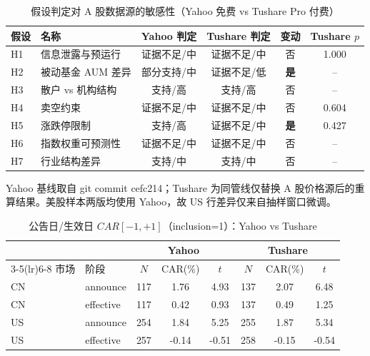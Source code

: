 \begin{table}[htbp]\centering
\caption{假设判定对 A 股数据源的敏感性（Yahoo 免费 vs Tushare Pro 付费）}
\label{tab:yahoo-vs-tushare-verdicts}
\begin{tabular}{llcccc}
\toprule
假设 & 名称 & Yahoo 判定 & Tushare 判定 & 变动 & Tushare $p$ \\
\midrule
H1 & 信息泄露与预运行 & 证据不足/中 & 证据不足/中 & 否 & 1.000 \\
H2 & 被动基金 AUM 差异 & 部分支持/中 & 证据不足/低 & \textbf{是} & -- \\
H3 & 散户 vs 机构结构 & 支持/高 & 支持/高 & 否 & -- \\
H4 & 卖空约束 & 证据不足/中 & 证据不足/中 & 否 & 0.604 \\
H5 & 涨跌停限制 & 支持/高 & 证据不足/中 & \textbf{是} & 0.427 \\
H6 & 指数权重可预测性 & 证据不足/中 & 证据不足/中 & 否 & -- \\
H7 & 行业结构差异 & 支持/中 & 支持/中 & 否 & -- \\
\bottomrule
\end{tabular}
\par\smallskip\footnotesize Yahoo 基线取自 git commit cefc214；Tushare 为同管线仅替换 A 股价格源后的重算结果。美股样本两版均使用 Yahoo，故 US 行差异仅来自抽样窗口微调。
\end{table}

\begin{table}[htbp]\centering
\caption{公告日/生效日 $CAR[-1,+1]$（inclusion=1）：Yahoo vs Tushare}
\label{tab:yahoo-vs-tushare-car}
\begin{tabular}{llcccccc}
\toprule
& & \multicolumn{3}{c}{Yahoo} & \multicolumn{3}{c}{Tushare} \\
\cmidrule(lr){3-5}\cmidrule(lr){6-8}
市场 & 阶段 & $N$ & CAR(\%) & $t$ & $N$ & CAR(\%) & $t$ \\
\midrule
CN & announce & 117 & 1.76 & 4.93 & 137 & 2.07 & 6.48 \\
CN & effective & 117 & 0.42 & 0.93 & 137 & 0.49 & 1.25 \\
US & announce & 254 & 1.84 & 5.25 & 255 & 1.87 & 5.34 \\
US & effective & 257 & -0.14 & -0.51 & 258 & -0.15 & -0.54 \\
\bottomrule
\end{tabular}
\end{table}
